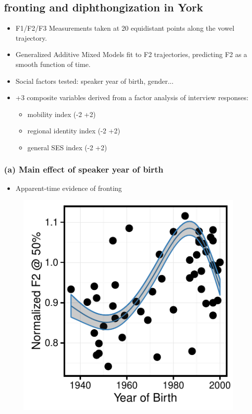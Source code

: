 \documentclass[a0,portrait]{a0poster}
\begin{document}
\begin{multicols*}{3}
\section*{ fronting and diphthongization in York}
\begin{itemize}
\item{F1/F2/F3 Measurements taken at 20 equidistant points along the vowel trajectory.}
\item{Generalized Additive Mixed Models fit to F2 trajectories, predicting F2 as a smooth function of time.}
\item{Social factors tested: speaker year of birth, gender...}
\item{+3 composite variables derived from a factor analysis of interview responses:\begin{itemize}\item{
mobility index (-2 +2)} \item{regional identity index (-2 +2)} \item{general SES index (-2 +2)}\end{itemize}}
\end{itemize}

\subsubsection*{(a) Main effect of speaker year of birth}
\begin{itemize}
\item{Apparent-time evidence of  fronting}
\end{itemize}
\vspace*{-1cm}
\begin{figure}[H]
\centering
\includegraphics[scale=2.25]{o_fronting_scurve.pdf}
\end{figure}


\end{multicols*}
\end{document}
